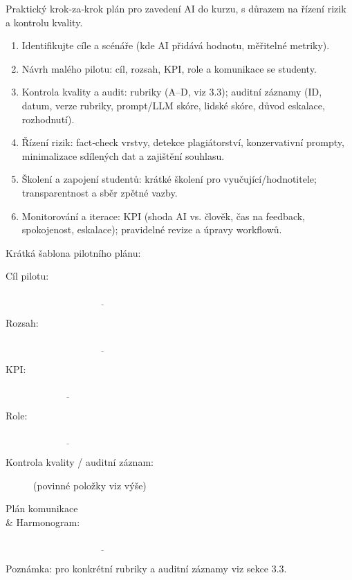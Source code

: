 Praktický krok‑za‑krok plán pro zavedení AI do kurzu, s důrazem na řízení rizik a kontrolu kvality.

\begin{enumerate}
\item Identifikujte cíle a scénáře (kde AI přidává hodnotu, měřitelné metriky).
\item Návrh malého pilotu: cíl, rozsah, KPI, role a komunikace se studenty.
\item Kontrola kvality a audit: rubriky (A–D, viz 3.3); auditní záznamy (ID, datum, verze rubriky, prompt/LLM skóre, lidské skóre, důvod eskalace, rozhodnutí).
\item Řízení rizik: fact‑check vrstvy, detekce plagiátorství, konzervativní prompty, minimalizace sdílených dat a zajištění souhlasu.
\item Školení a zapojení studentů: krátké školení pro vyučující/hodnotitele; transparentnost a sběr zpětné vazby.
\item Monitorování a iterace: KPI (shoda AI vs. člověk, čas na feedback, spokojenost, eskalace); pravidelné revize a úpravy workflowů.
\end{enumerate}

Krátká šablona pilotního plánu:
\begin{description}
\item[Cíl pilotu:] $\underline{\hspace{6cm}}$ \item[Rozsah:] $\underline{\hspace{6cm}}$ \item[KPI:] $\underline{\hspace{3cm}}$ \item[Role:] $\underline{\hspace{3cm}}$
\item[Kontrola kvality / auditní záznam:] (povinné položky viz výše) \item[Plán komunikace \\ \& Harmonogram:] $\underline{\hspace{6cm}}$
\end{description}
Poznámka: pro konkrétní rubriky a auditní záznamy viz sekce 3.3.